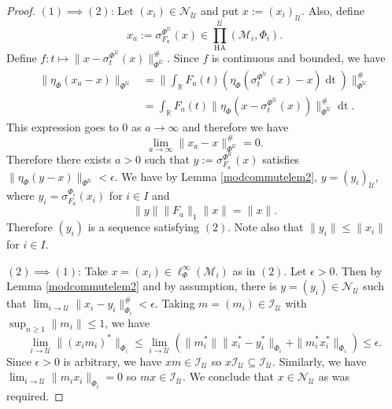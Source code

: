 \documentclass[12pt]{amsart}
\theoremstyle{definition}
\def\cal{\mathcal}
\newcommand\cU{{\cal U}}
\def \HA{\operatorname{HA}}
\def \bbR{\mathbb{R}}
\begin{document}
\begin{proof}
    $(1) \implies (2)$: Let $(x_i) \in \cal N_\cU$ and put $x := (x_i)_\cU$.  Also, define
    \[
        x_a := \sigma^{\Phi^{\cU}}_{F_a} (x) \in \prod_{\HA}^{\cU} (\cal M_i,\Phi_i).
    \]    
    Define $f : t \mapsto \|x-\sigma^{\Phi^{\cU}}_t(x) \|^\#_{\Phi^\cU}$.  Since $f$ is continuous and bounded, we have
    \begin{align}
        \| \eta_{\Phi}(x_a - x) \|_{\Phi^{\cU}} &= \| \int_{\bbR} F_a(t) (\eta_{\Phi}(\sigma^{\Phi^{\cU}}_t (x) - x) \operatorname{dt}) \|_{\Phi^\cU}^\# \nonumber \\
        &= \int_{\bbR} F_a(t) \|\eta_{\Phi}(x - \sigma^{\Phi^{\cU}}_t(x)) \|_{\Phi^\cU}^\# \operatorname{dt}.  \nonumber
    \end{align}
    This expression goes to $0$ as $a \to \infty$ and therefore we have
    \[
    \lim_{a\to \infty} \| x_a-x \|^\#_{\Phi^{\cU}} = 0.
    \]
    Therefore there exists $a > 0$ such that $y := \sigma^{\Phi^{\cU}}_{F_a} (x)$ satisfies $\|\eta_{\Phi}(y - x)\|_{\Phi^{\cU}} < \epsilon$.  We have by Lemma \ref{modcommutelem2}, $y = (y_i)_\cU$, where $y_i = \sigma^{\Phi_i}_{F_a} (x_i)$ for $i \in I$ and
    \[
    \| y \| \|F_a\|_1 \|x\| = \|x\|.
    \]
    Therefore $(y_i)$ is a sequence satisfying $(2)$.  Note also that $\|y_i\| \leq \|x_i\|$ for $i \in I$.

    $(2) \implies (1)$: Take $x = (x_i) \in \ell_{\Phi}^\infty (\cal M_i)$ as in $(2)$.  Let $\epsilon > 0$.  Then by Lemma \ref{modcommutelem2} and by assumption, there is $y = (y_i) \in \cal N_\cU$ such that $\lim_{i \to \cU} \| x_i - y_i \|^\#_{\Phi_i} < \epsilon$.  Taking $m = (m_i) \in \cal I_\cU$ with $\sup_{n \geq 1} \|m_i\| \leq 1$, we have
    \[
    \lim_{i \to\cU} \|(x_i m_i)^*\|_{\Phi_i} \leq \lim_{i \to\cU} ( \|m^*_i\| \|x^*_i - y^*_i\|_{\Phi_i} + \|m^*_ix_i^*\|_{\Phi_i}) \leq \epsilon.
    \]
    Since $\epsilon > 0$ is arbitrary, we have $xm \in \cal I_{\cU}$ so $x \cal I_{\cU} \subseteq \cal I_{\cU}$.  Similarly, we have $\lim_{i \to \cU} \| m_i x_i \|_{\Phi_i} = 0$ so $mx \in \cal I_{\cU}$.  We conclude that $x \in \cal N_\cU$ as was required.
\end{proof}
\end{document}
